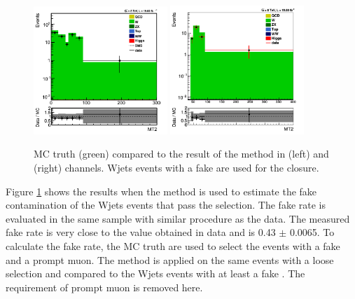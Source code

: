 \begin{figure}[!Hhtb]
\centering
\includegraphics[width=0.45\textwidth,keepaspectratio=true]{FakeRateMuTau/Estimation_pfWJets_ExtraLepExcl_SameSignWeightedHiggs.png}
\includegraphics[width=0.45\textwidth,keepaspectratio=true]{FakeRateEleTau/Closure.png}
\caption{MC truth (green) compared to the result of the method in \muTau (left) and \eTau (right) channels. Wjets events with a fake \Tau are used for the closure.}
\label{fig:LepTauClusure}
\end{figure}
Figure \ref{fig:LepTauClusure} shows the results when the method is used to estimate the fake contamination of the Wjets events that pass the selection. 
The fake rate is evaluated in the same sample with similar procedure as the data. The measured fake rate is very close to
the value obtained in data and is 0.43 $\pm$  0.0065. To calculate the fake rate, the MC truth are used to select the events with a fake \Tau 
and a prompt muon. The method is applied on the same events with a loose \Tau selection and compared to the Wjets events with at least 
a fake \Tau. The requirement of prompt muon is removed here.


